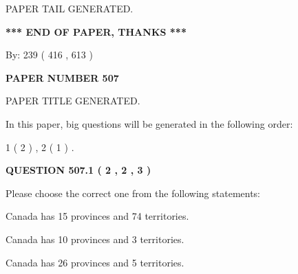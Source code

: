 \documentclass[12pt]{article}
\begin{document}
   
   
   
   
   
 \vspace{0.2in}
 
   
   
\vspace{2.0in} PAPER TAIL GENERATED.
   
   
   
   
\vspace{1.0in} 
{\textbf{\large{ *** END OF PAPER, THANKS *** }}} 
   
   
\hspace{1.0in} By: 
 239 ( 416 ,  613 )
   
   
   
   
\newpage 
\setcounter{page}{ 
   507001 } 
   
   
   
   
 {\textbf{ \Large{ PAPER NUMBER  507  }}}
   
   
\vspace{0.2in}
   
   
   
   
   
   
   
   
 \vspace{0.2in}
 
 
 
 
   
   
 PAPER TITLE GENERATED.
   
   
   
\vspace{0.2in}
   
In this paper, big questions will be generated in the following order: 
   
   
   1 ( 2 )
 ,
   2 ( 1 )
 .
  
\vspace{0.2in}
  
{\textbf{\Large{QUESTION
507.1 
 ( 2 , 2 , 3 )
}}}
  
  
Please choose the correct one from the following statements:
 
 
Canada has  15 provinces and  74 territories.
 
 
Canada has 10  provinces and 3 territories.
 
 
Canada has  26 provinces and  5 territories.
 
\end{document}
